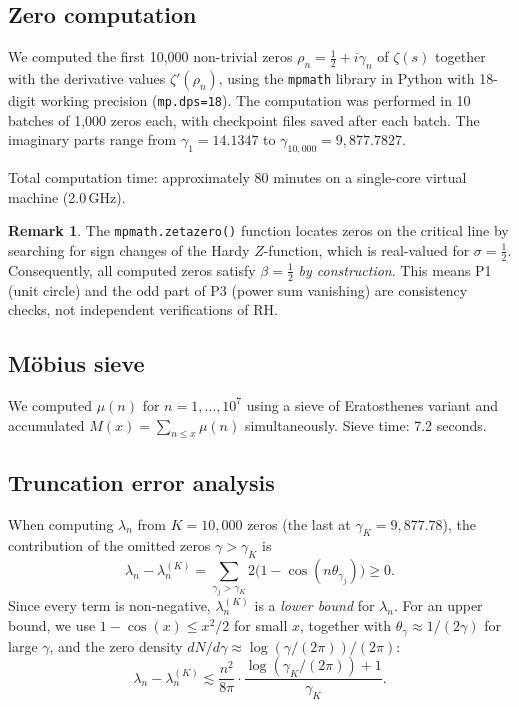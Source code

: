 \documentclass[11pt,a4paper]{article}
\theoremstyle{definition}
\newtheorem{remark}[theorem]{Remark}
\begin{document}
\subsection{Zero computation}

We computed the first 10{,}000 non-trivial zeros $\rho_n = \tfrac{1}{2} + i\gamma_n$ of $\zeta(s)$ together with the derivative values $\zeta'(\rho_n)$, using the \texttt{mpmath} library \cite{mpmath} in Python with 18-digit working precision (\texttt{mp.dps=18}). The computation was performed in 10 batches of 1{,}000 zeros each, with checkpoint files saved after each batch. The imaginary parts range from $\gamma_1 = 14.1347$ to $\gamma_{10{,}000} = 9{,}877.7827$.

Total computation time: approximately 80 minutes on a single-core virtual machine (2.0\,GHz).

\begin{remark}\label{rem:p1-circularity}
The \texttt{mpmath.zetazero()} function locates zeros on the critical line by searching for sign changes of the Hardy $Z$-function, which is real-valued for $\sigma = \tfrac{1}{2}$. Consequently, all computed zeros satisfy $\beta = \tfrac{1}{2}$ \emph{by construction}. This means P1 (unit circle) and the odd part of P3 (power sum vanishing) are consistency checks, not independent verifications of RH.
\end{remark}

\subsection{M\"obius sieve}

We computed $\mu(n)$ for $n = 1, \ldots, 10^7$ using a sieve of Eratosthenes variant and accumulated $M(x) = \sum_{n \leq x} \mu(n)$ simultaneously. Sieve time: 7.2 seconds.

\subsection{Truncation error analysis}
\label{sec:truncation}

When computing $\lambda_n$ from $K = 10{,}000$ zeros (the last at $\gamma_K = 9{,}877.78$), the contribution of the omitted zeros $\gamma > \gamma_K$ is
\begin{equation}\label{eq:tail-bound}
  \lambda_n - \lambda_n^{(K)} = \sum_{\gamma_j > \gamma_K} 2\bigl(1 - \cos(n\theta_{\gamma_j})\bigr) \geq 0.
\end{equation}
Since every term is non-negative, $\lambda_n^{(K)}$ is a \emph{lower bound} for $\lambda_n$. For an upper bound, we use $1 - \cos(x) \leq x^2/2$ for small $x$, together with $\theta_\gamma \approx 1/(2\gamma)$ for large $\gamma$, and the zero density $dN/d\gamma \approx \log(\gamma/(2\pi))/(2\pi)$:
\begin{equation}\label{eq:tail-est}
  \lambda_n - \lambda_n^{(K)} \lesssim \frac{n^2}{8\pi} \cdot \frac{\log(\gamma_K/(2\pi)) + 1}{\gamma_K}.
\end{equation}
\end{document}
